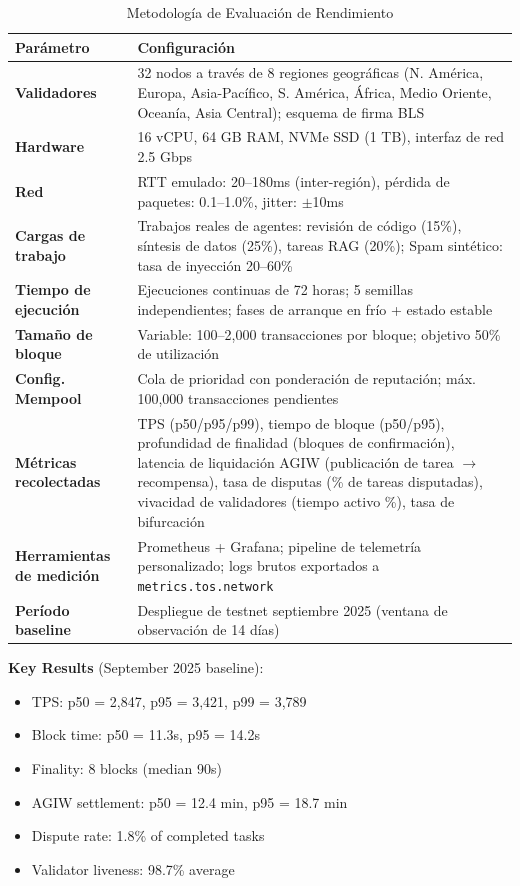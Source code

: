 \documentclass[11pt]{article}
\begin{document}
\begin{table}[H]
\centering
\caption{Metodología de Evaluación de Rendimiento}
\label{tab:evaluation-methodology}
\begin{tabular}{@{}p{}p{}@{}}
\toprule
\textbf{Parámetro} & \textbf{Configuración} \\ \midrule
\textbf{Validadores} & 32 nodos a través de 8 regiones geográficas (N. América, Europa, Asia-Pacífico, S. América, África, Medio Oriente, Oceanía, Asia Central); esquema de firma BLS \\
\textbf{Hardware} & 16 vCPU, 64 GB RAM, NVMe SSD (1 TB), interfaz de red 2.5 Gbps \\
\textbf{Red} & RTT emulado: 20--180ms (inter-región), pérdida de paquetes: 0.1--1.0\%, jitter: $\pm$10ms \\
\textbf{Cargas de trabajo} & Trabajos reales de agentes: revisión de código (15\%), síntesis de datos (25\%), tareas RAG (20\%); Spam sintético: tasa de inyección 20--60\% \\
\textbf{Tiempo de ejecución} & Ejecuciones continuas de 72 horas; 5 semillas independientes; fases de arranque en frío + estado estable \\
\textbf{Tamaño de bloque} & Variable: 100--2,000 transacciones por bloque; objetivo 50\% de utilización \\
\textbf{Config. Mempool} & Cola de prioridad con ponderación de reputación; máx. 100,000 transacciones pendientes \\
\textbf{Métricas recolectadas} & TPS (p50/p95/p99), tiempo de bloque (p50/p95), profundidad de finalidad (bloques de confirmación), latencia de liquidación AGIW (publicación de tarea $\rightarrow$ recompensa), tasa de disputas (\% de tareas disputadas), vivacidad de validadores (tiempo activo \%), tasa de bifurcación \\
\textbf{Herramientas de medición} & Prometheus + Grafana; pipeline de telemetría personalizado; logs brutos exportados a \texttt{metrics.tos.network} \\
\textbf{Período baseline} & Despliegue de testnet septiembre 2025 (ventana de observación de 14 días) \\
\bottomrule
\end{tabular}
\end{table}

\textbf{Key Results} (September 2025 baseline):
\begin{itemize}[noitemsep]
  \item TPS: p50 = 2,847, p95 = 3,421, p99 = 3,789
  \item Block time: p50 = 11.3s, p95 = 14.2s
  \item Finality: 8 blocks (median 90s)
  \item AGIW settlement: p50 = 12.4 min, p95 = 18.7 min
  \item Dispute rate: 1.8\% of completed tasks
  \item Validator liveness: 98.7\% average
\end{itemize}
\end{document}

